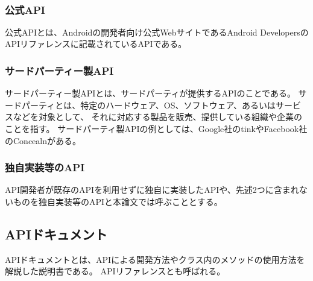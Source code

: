 
\subsubsection {公式API}
公式APIとは、Androidの開発者向け公式WebサイトであるAndroid DevelopersのAPIリファレンスに記載されているAPIである。

\subsubsection {サードパーティー製API}
サードパーティー製APIとは、サードパーティが提供するAPIのことである。
サードパーティとは、特定のハードウェア、OS、ソフトウェア、あるいはサービスなどを対象として、
それに対応する製品を販売、提供している組織や企業のことを指す。
サードパーティ製APIの例としては、Google社のtinkやFacebook社のConcealnがある。

\subsubsection {独自実装等のAPI}
API開発者が既存のAPIを利用せずに独自に実装したAPIや、先述2つに含まれないものを独自実装等のAPIと本論文では呼ぶこととする。

\fi

\subsection{APIドキュメント}
APIドキュメントとは、APIによる開発方法やクラス内のメソッドの使用方法を解説した説明書である。
APIリファレンス\cite{API_reference}とも呼ばれる。




























